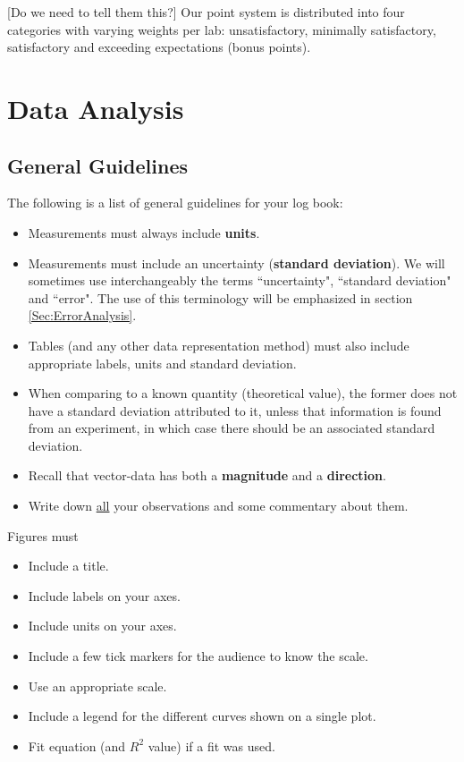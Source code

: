 \documentclass[12pt]{report}
\def\anhkhoi#1{{\color{purple}[#1]}}
\begin{document}
\anhkhoi{Do we need to tell them this?} Our point system is distributed into four categories with varying weights per lab: unsatisfactory, minimally satisfactory, satisfactory and exceeding expectations (bonus points).


\chapter{Data Analysis}
\label{Ch:Data-analysis}

\section{General Guidelines}
\label{Sec:General-guidelines}
The following is a list of general guidelines for your log book:
\begin{itemize}
\item Measurements must always include \textbf{units}.
\item Measurements must include an uncertainty (\textbf{standard deviation}). We will sometimes use interchangeably the terms ``uncertainty", ``standard deviation" and ``error". The use of this terminology will be emphasized in section \ref{Sec:ErrorAnalysis}.
\item Tables (and any other data representation method) must also include appropriate labels, units and standard deviation.
\item When comparing to a known quantity (theoretical value), the former does not have a standard deviation attributed to it, unless that information is found from an experiment, in which case there should be an associated standard deviation.
\item Recall that vector-data has both a \textbf{magnitude} and a \textbf{direction}.
\item Write down \underline{all} your observations and some commentary about them.
\end{itemize}

\noindent Figures must
\begin{itemize}
\item Include a title.
\item Include labels on your axes.
\item Include units on your axes.
\item Include a few tick markers for the audience to know the scale.
\item Use an appropriate scale.
\item Include a legend for the different curves shown on a single plot.
\item Fit equation (and $R^2$ value) if a fit was used.
\end{itemize}
\end{document}
